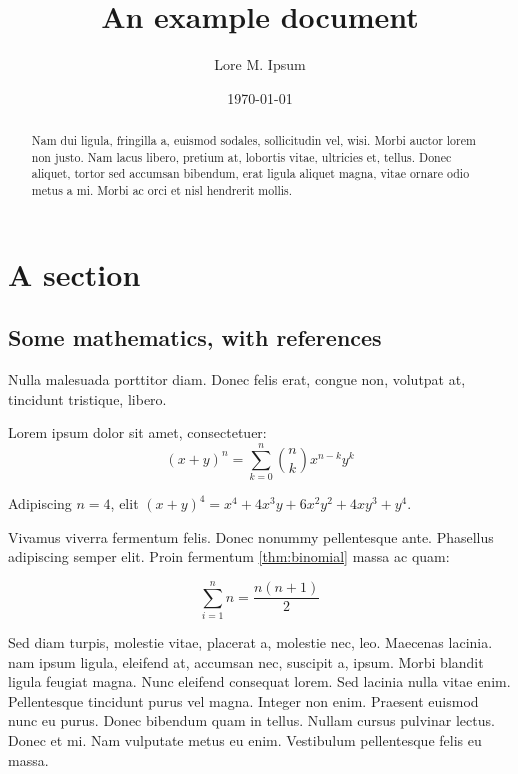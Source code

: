 \documentclass{rntz}
\title{An example document}
\author{Lore M. Ipsum}
\date{\today}
\begin{document}
\maketitle

\begin{abstract}
  Nam dui ligula, fringilla a, euismod sodales, sollicitudin vel, wisi. Morbi
  auctor lorem non justo. Nam lacus libero, pretium at, lobortis vitae,
  ultricies et, tellus. Donec aliquet, tortor sed accumsan bibendum, erat ligula
  aliquet magna, vitae ornare odio metus a mi. Morbi ac orci et nisl hendrerit
  mollis.
\end{abstract}

\section{A section}\label{sec:one}
\lipsum[4]

\subsection{Some mathematics, with references}

Nulla malesuada porttitor diam. Donec felis erat, congue non,
volutpat at, tincidunt tristique, libero.

\begin{theorem}[Binomial]\label{thm:binomial} Lorem ipsum dolor sit amet, consectetuer:
  \[ (x+y)^n = \sum_{k=0}^n \binom{n}{k} x^{n-k} y^k \]
\end{theorem}

\begin{corollary} Adipiscing $n=4$, elit
  \( (x+y)^4 = x^4 + 4x^3y + 6x^2y^2 + 4xy^3 + y^4 \).
\end{corollary}

Vivamus viverra fermentum felis. Donec nonummy pellentesque ante. Phasellus
adipiscing semper elit. Proin fermentum \cref{thm:binomial} massa ac quam:

\[ \sum_{i=1}^n n = \frac{n(n+1)}{2} \]


Sed diam turpis, molestie vitae, placerat a, molestie nec, leo. Maecenas lacinia.  nam ipsum ligula, eleifend at, accumsan nec, suscipit a, ipsum. Morbi blandit ligula feugiat magna. Nunc eleifend consequat lorem. Sed lacinia nulla vitae enim. Pellentesque tincidunt purus vel magna. Integer non enim. Praesent euismod nunc eu purus. Donec bibendum quam in tellus. Nullam cursus pulvinar lectus. Donec et mi. Nam vulputate metus eu enim. Vestibulum pellentesque felis eu massa.
\end{document}

